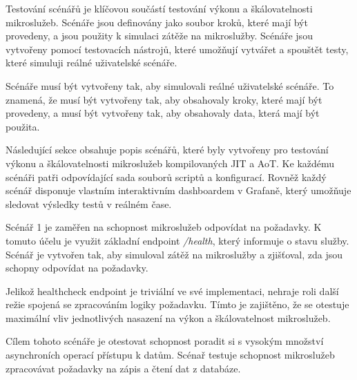 

Testování scénářů je klíčovou součástí testování výkonu a škálovatelnosti mikroslužeb. Scénáře jsou definovány jako soubor kroků, které mají být provedeny, a jsou použity k simulaci zátěže na mikroslužby. Scénáře jsou vytvořeny pomocí testovacích nástrojů, které umožňují vytvářet a spouštět testy, které simuluji reálné uživatelské scénáře.


Scénáře musí být vytvořeny tak, aby simulovali reálné uživatelské scénáře. To znamená, že musí být vytvořeny tak, aby obsahovaly kroky, které mají být provedeny, a musí být vytvořeny tak, aby obsahovaly data, která mají být použita.


Následující sekce obsahuje popis scénářů, které byly vytvořeny pro testování výkonu a škálovatelnosti mikroslužeb kompilovaných JIT a AoT. Ke každému scénáři patři odpovídající sada souborů scriptů a konfigurací. Rovněž každý scénář disponuje vlastním interaktivním dashboardem v Grafaně, který umožňuje sledovat výsledky testů v reálném čase.


Scénář 1 je zaměřen na schopnost mikroslužeb odpovídat na požadavky. K tomuto účelu je využit základní endpoint \emph{/health}, který informuje o stavu služby. Scénář je vytvořen tak, aby simuloval zátěž na mikroslužby a zjišťoval, zda jsou schopny odpovídat na požadavky.

Jelikož healthcheck endpoint je triviální ve své implementaci, nehraje roli další režie spojená se zpracováním logiky požadavku. Tímto je zajištěno, že se otestuje maximální vliv jednotlivých nasazení na výkon a škálovatelnost mikroslužeb.


Cílem tohoto scénáře je otestovat schopnost poradit si s vysokým množství asynchroních operací přístupu k datům. Scénař testuje schopnost mikroslužeb zpracovávat požadavky na zápis a čtení dat z databáze.



